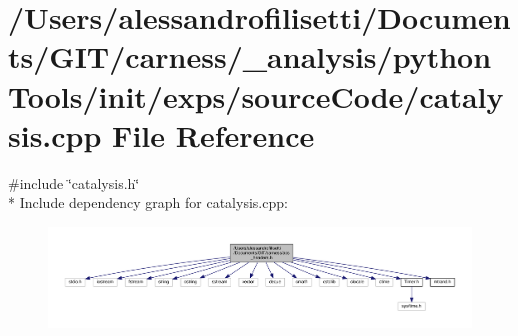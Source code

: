 \hypertarget{a00052}{\section{/\-Users/alessandrofilisetti/\-Documents/\-G\-I\-T/carness/\-\_\-analysis/python\-Tools/init/exps/source\-Code/catalysis.cpp File Reference}
\label{a00052}
}
{\ttfamily \#include \char`\"{}catalysis.\-h\char`\"{}}\\*
Include dependency graph for catalysis.\-cpp\-:
\nopagebreak
\begin{figure}[H]
\begin{center}
\leavevmode
\includegraphics[width=350pt]{a00164}
\end{center}
\end{figure}
